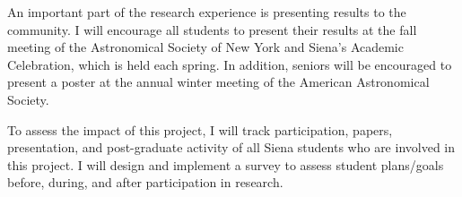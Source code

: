 \documentclass[11pt, preprint]{aastex}
\newcommand{\ha}{$H\alpha$}
\begin{document}
{%


An important part of the research experience is presenting results
to the community. I will encourage all students 
to present their results at the fall meeting of the 
Astronomical Society of New York and Siena's Academic Celebration, which
is held each spring.  In addition, seniors will be encouraged to
present a poster at the 
annual winter meeting of the American Astronomical Society.  

To assess the impact of this project, I will track participation, papers, 
presentation, and post-graduate activity of all Siena students
who are involved in this project.  I will design and implement a survey to 
assess student plans/goals before, during, and after
participation in research.

}
\end{document}
